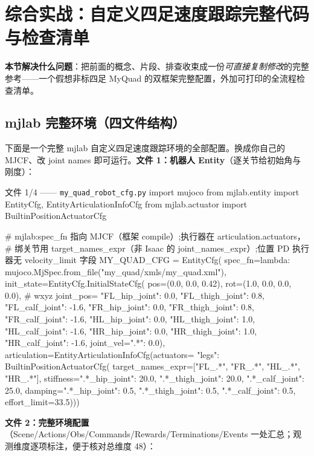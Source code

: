 \section{综合实战：自定义四足速度跟踪完整代码与检查清单}
\label{sec:rlmc-diy-fullcode}

\textbf{本节解决什么问题}：把前面的概念、片段、排查收束成一份\emph{可直接复制修改}的完整参考——一个假想非标四足 MyQuad 的双框架完整配置，外加可打印的全流程检查清单。

\subsection{mjlab 完整环境（四文件结构）}
\label{sec:rlmc-diy-fullcode-mjlab}

下面是一个完整 mjlab 自定义四足速度跟踪环境的全部配置。换成你自己的 MJCF、改 joint names 即可运行。\textbf{文件 1：机器人 Entity}（逐关节给初始角与刚度）：

\begin{codebox}[Python]{文件 1/4 —— \texttt{my\_quad\_robot\_cfg.\allowbreak py}}
import mujoco
from mjlab.entity import EntityCfg, EntityArticulationInfoCfg
from mjlab.actuator import BuiltinPositionActuatorCfg

# mjlab:spec_fn 指向 MJCF（框架 compile）;执行器在 articulation.actuators，
# 绑关节用 target_names_expr（非 Isaac 的 joint_names_expr）;位置 PD 执行器无 velocity_limit 字段
MY_QUAD_CFG = EntityCfg(
    spec_fn=lambda: mujoco.MjSpec.from_file("my_quad/xmls/my_quad.xml"),
    init_state=EntityCfg.InitialStateCfg(
        pos=(0.0, 0.0, 0.42), rot=(1.0, 0.0, 0.0, 0.0),     # wxyz
        joint_pos={
            "FL_hip_joint": 0.0, "FL_thigh_joint": 0.8, "FL_calf_joint": -1.6,
            "FR_hip_joint": 0.0, "FR_thigh_joint": 0.8, "FR_calf_joint": -1.6,
            "HL_hip_joint": 0.0, "HL_thigh_joint": 1.0, "HL_calf_joint": -1.6,
            "HR_hip_joint": 0.0, "HR_thigh_joint": 1.0, "HR_calf_joint": -1.6},
        joint_vel={".*": 0.0}),
    articulation=EntityArticulationInfoCfg(actuators={
        "legs": BuiltinPositionActuatorCfg(
            target_names_expr=["FL_.*", "FR_.*", "HL_.*", "HR_.*"],
            stiffness={".*_hip_joint": 20.0, ".*_thigh_joint": 20.0, ".*_calf_joint": 25.0},
            damping={".*_hip_joint": 0.5, ".*_thigh_joint": 0.5, ".*_calf_joint": 0.5},
            effort_limit=33.5)}))
\end{codebox}

\textbf{文件 2：完整环境配置}（Scene/Actions/Obs/Commands/Rewards/Terminations/Events 一处汇总；观测维度逐项标注，便于核对总维度 48）：

